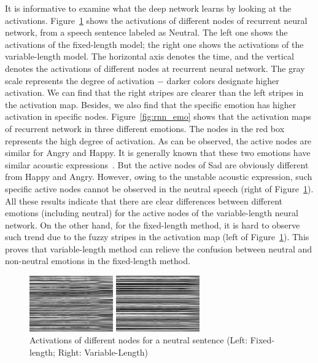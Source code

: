 \documentclass[a4paper]{article}
\begin{document}
It is informative to examine what the deep network learns by looking at the activations. Figure~\ref{fig:rnn_comp} shows the activations of different nodes of recurrent neural network, from a speech sentence labeled as Neutral. The left one shows the activations of the fixed-length model; the right one shows the activations of the variable-length model. The horizontal axis denotes the time, and the vertical denotes the activations of different nodes at recurrent neural network. The gray scale represents the degree of activation $-$ darker colors designate higher activation. We can find that the right stripes are clearer than the left stripes in the activation map. Besides, we also find that the specific emotion has higher activation in specific nodes. Figure~\ref{fig:rnn_emo} shows that the activation maps of recurrent network in three different emotions. The nodes in the red box represents the high degree of activation. As can be observed, the active nodes are similar for Angry and Happy. It is generally known that these two emotions have similar acoustic expressions~\cite{ma2017}. But the active nodes of Sad are obviously different from Happy and Angry. However, owing to the unstable acoustic expression, such specific active nodes cannot be observed in the neutral speech (right of Figure~\ref{fig:rnn_comp}). All these results indicate that there are clear differences between different emotions (including neutral) for the active nodes of the variable-length neural network.  On the other hand, for the fixed-length method, it is hard to observe such trend due to the fuzzy stripes in the activation map (left of Figure~\ref{fig:rnn_comp}). This proves that variable-length method can relieve the confusion between neutral and non-neutral emotions in the fixed-length method.

\begin{figure}[htb]
    \begin{minipage}[b]{0.45\linewidth}
      \centering
      \centerline{\includegraphics[width=3.6cm]{rnn_out_const_neu_comp}}
    \end{minipage}
    \hfill
    \begin{minipage}[b]{0.45\linewidth}
      \centering
      \centerline{\includegraphics[width=3.6cm]{rnn_out_var_neu_comp}}
    \end{minipage}
    \caption{Activations of different nodes for a neutral sentence (Left: Fixed-length; Right: Variable-Length)}
    \label{fig:rnn_comp}
\end{figure}
\end{document}
